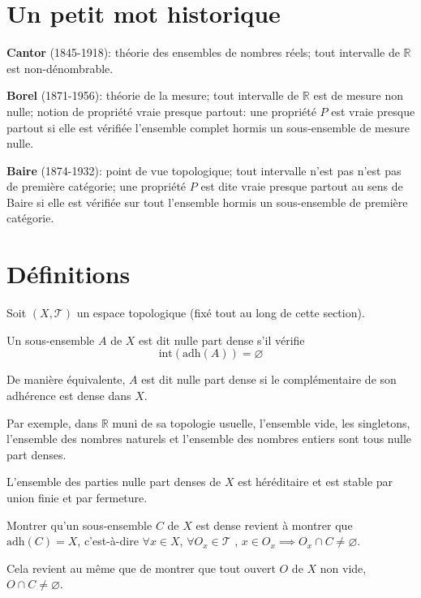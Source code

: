 \section{Un petit mot historique}
\textbf{Cantor} (1845-1918): théorie des ensembles de nombres réels;
tout intervalle de $\mathbb{R}$ est non-dénombrable.

\textbf{Borel} (1871-1956): théorie de la mesure; tout intervalle
de $\mathbb{R}$ est de mesure non nulle; notion de propriété vraie
presque partout: une propriété $P$ est vraie presque partout si
elle est vérifiée l'ensemble complet hormis un sous-ensemble de mesure
nulle.

\textbf{Baire} (1874-1932): point de vue topologique; tout intervalle
n'est pas n'est pas de première catégorie; une propriété $P$ est dite
vraie presque partout au sens de Baire si elle est vérifiée sur tout
l'ensemble hormis un sous-ensemble de première catégorie.

\section{Définitions}

Soit $(X, \mathcal{T})$ un espace topologique (fixé tout au long de cette
section).

\begin{df}
  Un sous-ensemble $A$ de $X$ est dit nulle part dense s'il vérifie
  $$\mathrm{int}\left(\mathrm{adh}(A)\right) = \varnothing$$

  De manière équivalente, $A$ est dit nulle part dense si le complémentaire
  de son adhérence est dense dans $X$.
\end{df}

Par exemple, dans $\mathbb{R}$ muni de sa topologie usuelle, l'ensemble
vide, les singletons, l'ensemble des nombres naturels et l'ensemble des
nombres entiers sont tous nulle part denses.

\begin{prop}
  L'ensemble des parties nulle part denses de $X$ est héréditaire et
  est stable par union finie  et par fermeture.
\end{prop}

\begin{rem}
  Montrer qu'un sous-ensemble $C$ de $X$ est dense revient à
  montrer que $\mathrm{adh}(C) = X$, c'est-à-dire
  $\forall x\in X$, $\forall O_x\in\mathcal{T}$ , $x\in O_x\implies O_x\cap C\neq
  \varnothing$.

  Cela revient au même que de montrer que tout ouvert $O$ de $X$ non vide,
  $O\cap C\neq \varnothing$.
\end{rem}

